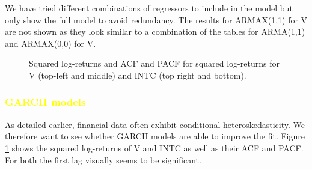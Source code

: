 We have tried different combinations of regressors to include in the model but only show the full model to avoid redundancy. The results for ARMAX(1,1) for V are not shown as they look similar to a combination of the tables for ARMA(1,1) and ARMAX(0,0) for V. 

\begin{figure}[h]
    \centering
    \begin{adjustbox}{width=.95\textwidth,center}
    
    
    \end{adjustbox}
    \hspace{3ex}
    \begin{adjustbox}{width=.95\textwidth,center}
    
    \end{adjustbox}
    \begin{adjustbox}{width=.95\textwidth,center}
    
    \end{adjustbox}
    \caption{Squared log-returns and ACF and PACF for squared log-returns for V (top-left and middle) and INTC (top right and bottom).}
    \label{fig:V_INTC_squared}
\end{figure}

\subsubsection{\textcolor{yellow}{GARCH models}}
As detailed earlier, financial data often exhibit conditional heteroskedasticity. We therefore want to see whether GARCH models are able to improve the fit. Figure \ref{fig:V_INTC_squared} shows the squared log-returns of V and INTC as well as their ACF and PACF. For both the first lag visually seems to be significant. 

